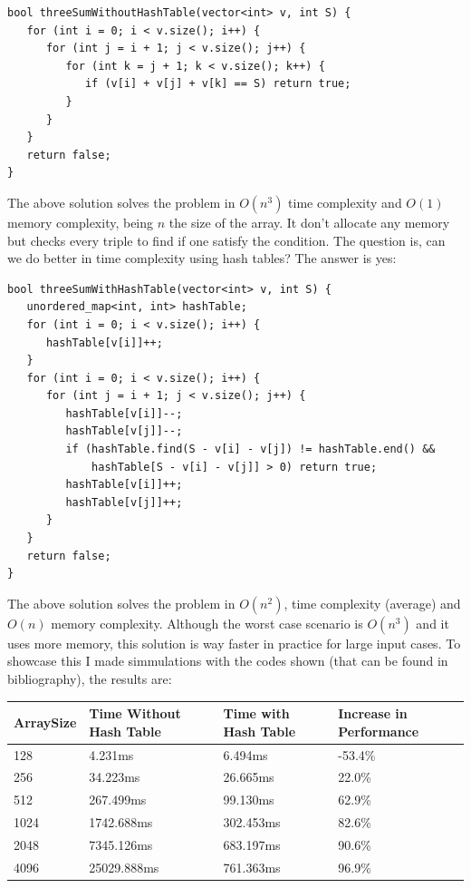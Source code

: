 \begin{lstlisting}
bool threeSumWithoutHashTable(vector<int> v, int S) {
   for (int i = 0; i < v.size(); i++) {
      for (int j = i + 1; j < v.size(); j++) {
         for (int k = j + 1; k < v.size(); k++) {
            if (v[i] + v[j] + v[k] == S) return true;
         }
      }
   }
   return false;
}
\end{lstlisting}

\medskip

The above solution solves the problem in \( O(n^3) \) time complexity and \( O(1) \) memory complexity, being \( n \) the size of the array. It don't allocate any memory but checks every triple to find if one satisfy the condition. The question is, can we do better in time complexity using hash tables? The answer is yes:

\medskip

\begin{lstlisting}
bool threeSumWithHashTable(vector<int> v, int S) {
   unordered_map<int, int> hashTable; 
   for (int i = 0; i < v.size(); i++) {
      hashTable[v[i]]++;
   }
   for (int i = 0; i < v.size(); i++) {
      for (int j = i + 1; j < v.size(); j++) {
         hashTable[v[i]]--;
         hashTable[v[j]]--;         
         if (hashTable.find(S - v[i] - v[j]) != hashTable.end() &&
             hashTable[S - v[i] - v[j]] > 0) return true;
         hashTable[v[i]]++;
         hashTable[v[j]]++;
      }
   }
   return false;
}
\end{lstlisting}

\medskip

The above solution solves the problem in \( O(n^2) \), time complexity (average) and \( O(n) \) memory complexity. Although the worst case scenario is \( O(n^3) \) and it uses more memory, this solution is way faster in practice for large input cases. To showcase this I made simmulations with the codes shown (that can be found in bibliography), the results are: \\

\bigskip

\begin{tabular}{|l|l|l|l|}
  \hline
  ArraySize & Time Without Hash Table & Time with Hash Table & Increase in Performance \\
  \hline
  128       & 4.231ms                 & 6.494ms              & -53.4\%                  \\
  \hline
  256       & 34.223ms                & 26.665ms             & 22.0\%                   \\
  \hline
  512       & 267.499ms               & 99.130ms             & 62.9\%                   \\
  \hline
  1024      & 1742.688ms              & 302.453ms            & 82.6\%                   \\
  \hline
  2048      & 7345.126ms              & 683.197ms            & 90.6\%                   \\
  \hline
  4096      & 25029.888ms             & 761.363ms            & 96.9\%                   \\
  \hline
\end{tabular}

